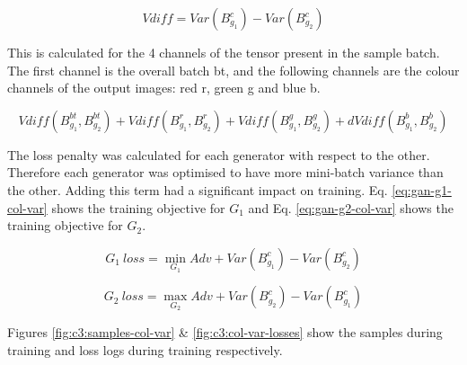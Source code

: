 \begin{equation}
    \label{eq:variance-gan}
    Vdiff = Var(B_{g_{1}}^{c}) - Var(B_{g_{2}}^{c})
    \end{equation}

This is calculated for the 4 channels of the tensor present in the sample batch. 
The first channel is the overall batch bt, and the following channels are the colour channels of the output images: red r, green g and blue b.

\begin{equation}
    \label{eq:total-gan}
        Vdiff(B_{g_{1}}^{bt} , B_{g_{2}}^{bt}) + Vdiff(B_{g_{1}}^{r} , B_{g_{2}}^{r}) + Vdiff(B_{g_{1}}^{g} , B_{g_{2}}^{g}) +  dVdiff(B_{g_{1}}^{b} , B_{g_{2}}^{b}) 
    \end{equation}

The loss penalty was calculated for each generator with respect to the other. 
Therefore each generator was optimised to have more mini-batch variance than the other. 
Adding this term had a significant impact on training. 
Eq. \ref{eq:gan-g1-col-var} shows the training objective for $G_
{1}$ and Eq.  \ref{eq:gan-g2-col-var} shows the training objective for $G_{2}$.

\begin{equation} 
    G_{1}\ loss = \min_{G_{1}}Adv + Var(B_{g_{1}}^{c}) - Var(B_{g_{2}}^{c})
    \label{eq:gan-g1-col-var}
\end{equation}

\begin{equation} 
    G_{2}\ loss = \max_{G_{2}}Adv + Var(B_{g_{2}}^{c}) - Var(B_{g_{1}}^{c})
    \label{eq:gan-g2-col-var}
\end{equation}

Figures \ref{fig:c3:samples-col-var} \& \ref{fig:c3:col-var-losses} show the samples during training and loss logs during training respectively.

